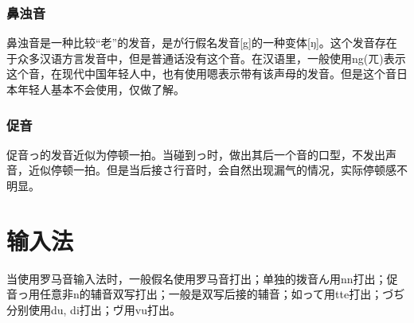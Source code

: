 \documentclass[12pt, a4paper, oneside]{book}
\begin{document}
\subsection{鼻浊音}\label{sct:bdo}
鼻浊音是一种比较“老”的发音，是が行假名发音[g]的一种变体[ŋ]。这个发音存在于众多汉语方言发音中，但是普通话没有这个音。在汉语里，一般使用ng(ㄫ)表示这个音，在现代中国年轻人中，也有使用嗯表示带有该声母的发音。但是这个音日本年轻人基本不会使用，仅做了解。
\subsection{促音}
促音っ的发音近似为停顿一拍。当碰到っ时，做出其后一个音的口型，不发出声音，近似停顿一拍。但是当后接さ行音时，会自然出现漏气的情况，实际停顿感不明显。
\chapter{输入法}
当使用罗马音输入法时，一般假名使用罗马音打出；单独的拨音ん用nn打出；促音っ用任意非n的辅音双写打出；一般是双写后接的辅音；如って用tte打出；づぢ分别使用du, di打出；ヴ用vu打出。
\end{document}
